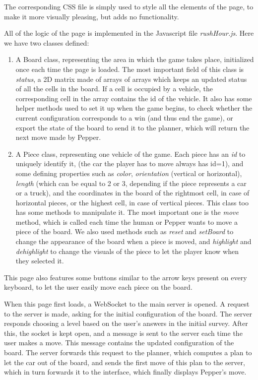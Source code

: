 \documentclass{article}
\begin{document}


The corresponding CSS file is simply used to style all the elements of the page, to make it more visually pleasing, but adds no functionality.

All of the logic of the page is implemented in the Javascript file \textit{rushHour.js}. Here we have two classes defined: 
\begin{enumerate}
    \item A Board class, representing the area in which the game takes place, initialized once each time the page is loaded. The most important field of this class is \textit{status}, a 2D matrix made of arrays of arrays which keeps an updated status of all the cells in the board. If a cell is occupied by a vehicle, the corresponding cell in the array contains the id of the vehicle. It also has some helper methods used to set it up when the game begins, to check whether the current configuration corresponds to a win (and thus end the game), or export the state of the board to send it to the planner, which will return the next move made by Pepper.
    \item A Piece class, representing one vehicle of the game. Each piece has an \textit{id} to uniquely identify it, (the car the player has to move always has id=1), and some defining properties such as \textit{color}, \textit{orientation} (vertical or horizontal), \textit{length} (which can be equal to 2 or 3, depending if the piece represents a car or a truck), and the coordinates in the board of the rightmost cell, in case of horizontal pieces, or the highest cell, in case of vertical pieces. This class too has some methods to manipulate it. The most important one is the \textit{move} method, which is called each time the human or Pepper wants to move a piece of the board. We also used methods such as \textit{reset} and \textit{setBoard} to change the appearance of the board when a piece is moved, and \textit{highlight} and \textit{dehighlight} to change the visuals of the piece to let the player know when they selected it.
\end{enumerate}

This page also features some buttons similar to the arrow keys present on every keyboard, to let the user easily move each piece on the board.

When this page first loads, a WebSocket to the main server is opened. A request to the server is made, asking for the initial configuration of the board. The server responds choosing a level based on the user's answers in the initial survey. After this, the socket is kept open, and a message is sent to the server each time the user makes a move. This message contains the updated configuration of the board. The server forwards this request to the planner, which computes a plan to let the car out of the board, and sends the first move of this plan to the server, which in turn forwards it to the interface, which finally displays Pepper's move.
\end{document}
